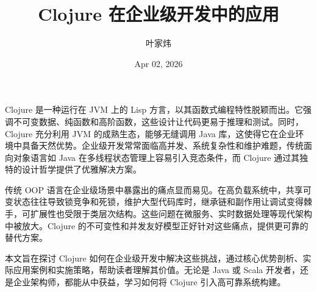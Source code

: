 \title{Clojure 在企业级开发中的应用}
\author{叶家炜}
\date{Apr 02, 2026}
\maketitle
Clojure 是一种运行在 JVM 上的 Lisp 方言，以其函数式编程特性脱颖而出。它强调不可变数据、纯函数和高阶函数，这些设计让代码更易于推理和测试。同时，Clojure 充分利用 JVM 的成熟生态，能够无缝调用 Java 库，这使得它在企业环境中具备天然优势。企业级开发常常面临高并发、系统复杂性和维护难题，传统面向对象语言如 Java 在多线程状态管理上容易引入竞态条件，而 Clojure 通过其独特的设计哲学提供了优雅解决方案。\par
传统 OOP 语言在企业级场景中暴露出的痛点显而易见。在高负载系统中，共享可变状态往往导致锁竞争和死锁，维护大型代码库时，继承链和副作用让调试变得棘手，可扩展性也受限于类层次结构。这些问题在微服务、实时数据处理等现代架构中被放大。Clojure 的不可变性和并发友好模型正好针对这些痛点，提供更可靠的替代方案。\par
本文旨在探讨 Clojure 如何在企业级开发中解决这些挑战，通过核心优势剖析、实际应用案例和实施策略，帮助读者理解其价值。无论是 Java 或 Scala 开发者，还是企业架构师，都能从中获益，学习如何将 Clojure 引入高可靠系统构建。\par

